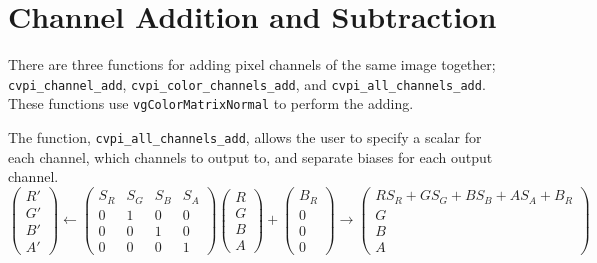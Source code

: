 \documentclass[12pt]{report}
\begin{document}
\section{Channel Addition and Subtraction}
\label{sec-3-7}
There are three functions for adding pixel channels of the same
image together; {\tt cvpi\_channel\_add},
{\tt cvpi\_color\_channels\_add}, and {\tt cvpi\_all\_channels\_add}.
These functions use {\tt vgColorMatrixNormal} to perform the adding.

The function, {\tt cvpi\_all\_channels\_add}, allows the user to specify a
scalar for each channel, which channels to output to, and separate biases
for each output channel.
   \[
 \begin{pmatrix} R' \\ G' \\ B' \\ A' \end{pmatrix}
          \gets \begin{pmatrix} S_R & S_G & S_B &
 S_A \\ 0 & 1 & 0 & 0 \\ 0 & 0 & 1 & 0 \\ 0 & 0 & 0 & 1 \end{pmatrix}
  \begin{pmatrix} R \\ G \\ B \\ A \end{pmatrix}
  + \begin{pmatrix} B_R \\ 0 \\ 0 \\ 0 \end{pmatrix} \to \begin{pmatrix} R S_R + G S_G + B S_B + A S_A
  + B_R \\ G \\ B \\ A \end{pmatrix}
\]
\end{document}
